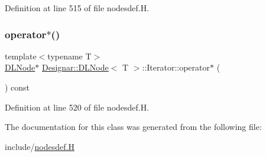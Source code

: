 Definition at line 515 of file nodesdef.\+H.

\mbox{\label{class_designar_1_1_d_l_node_1_1_iterator_ae75896ae631f91daaaa9a193df27a239}} 
\subsubsection{\texorpdfstring{operator$\ast$()}{operator*()}\hspace{0.1cm}{\footnotesize\ttfamily [2/2]}}
{\footnotesize\ttfamily template$<$typename T$>$ \\
\hyperlink{class_designar_1_1_d_l_node}{D\+L\+Node}$\ast$ \hyperlink{class_designar_1_1_d_l_node}{Designar\+::\+D\+L\+Node}$<$ T $>$\+::Iterator\+::operator$\ast$ (\begin{DoxyParamCaption}{ }\end{DoxyParamCaption}) const\hspace{0.3cm}{\ttfamily [inline]}}



Definition at line 520 of file nodesdef.\+H.



The documentation for this class was generated from the following file\+:\begin{DoxyCompactItemize}
\item 
include/\hyperlink{nodesdef_8_h}{nodesdef.\+H}\end{DoxyCompactItemize}
